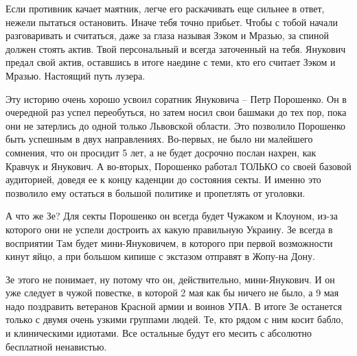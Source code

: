 Если противник качает маятник, легче его раскачивать еще сильнее в ответ,
нежели пытаться остановить. Иначе тебя точно прибьет. Чтобы с тобой начали
разговаривать и считаться, даже за глаза называя Зэком и Мразью, за спиной
должен стоять актив. Твой персональный и всегда заточенный на тебя. Янукович
предал свой актив, оставшись в итоге наедине с теми, кто его считает Зэком и
Мразью. Настоящий путь лузера.

Эту историю очень хорошо усвоил соратник Януковича – Петр Порошенко. Он в
очередной раз успел переобуться, но затем носил свои башмаки до тех пор, пока
они не затерлись до одной только Львовской области. Это позволило Порошенко
быть успешным в двух направлениях. Во-первых, не было ни малейшего сомнения,
что он просидит 5 лет, а не будет досрочно послан нахрен, как Кравчук и
Янукович. А во-вторых, Порошенко работал ТОЛЬКО со своей базовой аудиторией,
доведя ее к концу каденции до состояния секты. И именно это позволило ему
остаться в большой политике и пропетлять от уголовки.

А что же Зе? Для секты Порошенко он всегда будет Чужаком и Клоуном, из-за
которого они не успели достроить ах какую правильную Украину. Зе всегда в
восприятии Там будет мини-Януковичем, в которого при первой возможности кинут
яйцо, а при большом кипише с экстазом отправят в Жопу-на Дону.

Зе этого не понимает, ну потому что он, действительно, мини-Янукович. И он уже
следует в чужой повестке, в которой 2 мая как бы ничего не было, а 9 мая надо
поздравить ветеранов Красной армии и воинов УПА. В итоге Зе останется только с
двумя очень узкими группами людей. Те, кто рядом с ним косит бабло, и
клиническими идиотами. Все остальные будут его месить с абсолютно бесплатной
ненавистью.
